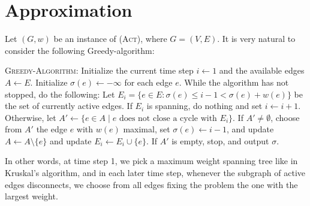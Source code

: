 \documentclass[runningheads]{llncs}
\numberwithin{equation}{section}
\newcommand{\set}[1]{\{ #1 \}}
\newcommand{\act}{\textsc{(Act)}}
\begin{document}
\section{Approximation}

Let $(G, w)$ be an instance of {\act}, where $G  = (V, E)$. It is very natural to consider the following Greedy-algorithm:

\textsc{Greedy-Algorithm}: Initialize the current time step $i \leftarrow 1$ and the available edges $A \leftarrow E$. Initialize $\sigma(e) \leftarrow - \infty$ for each edge $e$. While the algorithm has not stopped, do the following: Let $E_i = \set{e \in E : \sigma(e) \leq i - 1 < \sigma(e) + w(e)}$ be the set of currently active edges. If $E_i$ is spanning, do nothing and set $i \leftarrow i+1$. Otherwise, let $A' \leftarrow \set{e \in A \mid e \text{ does not close a cycle with } E_i}$. If $A' \neq \emptyset$, choose from $A'$ the edge $e$ with $w(e)$ maximal, set $\sigma(e) \leftarrow i - 1$, and update $A \leftarrow A \setminus \set{e}$ and update $E_i \leftarrow E_i \cup \set{e}$. If $A'$ is empty, stop, and output $\sigma$.

In other words, at time step 1, we pick a maximum weight spanning tree like in Kruskal's algorithm, and in each later time step, whenever the subgraph of active edges disconnects, we choose from all edges fixing the problem the one with the largest weight.
\end{document}
